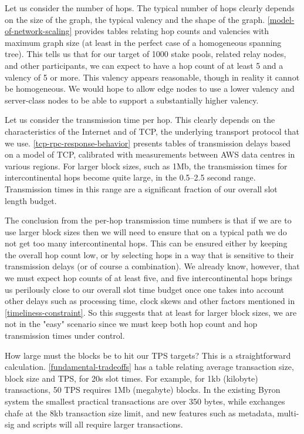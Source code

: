 \documentclass[11pt,a4paper]{article}
\begin{document}
Let us consider the number of hops. The typical number of hops clearly
depends on the size of the graph, the typical valency and the shape of
the graph. \cref{model-of-network-scaling}
provides tables relating hop counts and valencies with maximum graph
size (at least in the perfect case of a homogeneous spanning tree). This
tells us that for our target of 1000 stake pools, related relay nodes,
and other participants, we can expect to have a hop count of at least 5
and a valency of 5 or more. This valency appears reasonable, though in
reality it cannot be homogeneous. We would hope to allow edge nodes to
use a lower valency and server-class nodes to be able to support a
substantially higher valency.

Let us consider the transmission time per hop. This clearly depends on
the characteristics of the Internet and of TCP, the underlying transport
protocol that we use.
\cref{tcp-rpc-response-behavior} presents
tables of transmission delays based on a model of TCP, calibrated with
measurements between AWS data centres in various regions. For larger
block sizes, such as 1Mb, the transmission times for intercontinental
hops become quite large, in the 0.5--2.5 second range. Transmission
times in this range are a significant fraction of our overall slot
length budget.

The conclusion from the per-hop transmission time numbers is that if we
are to use larger block sizes then we will need to ensure that on a
typical path we do not get too many intercontinental hops. This can be
ensured either by keeping the overall hop count low, or by selecting
hops in a way that is sensitive to their transmission delays (or of
course a combination). We already know, however, that we must expect hop
counts of at least five, and five intercontinental hops brings us
perilously close to our overall slot time budget once one takes into
account other delays such as processing time, clock skews and other
factors mentioned in \cref{timeliness-constraint}. So this suggests that at least for larger block sizes, we are
not in the "easy" scenario since we must keep both hop count and hop
transmission times under control.

How large must the blocks be to hit our TPS targets? This is a
straightforward calculation.
\cref{fundamental-tradeoffs} has a table
relating average transaction size, block size and TPS, for 20s slot
times. For example, for 1kb (kilobyte) transactions, 50 TPS requires 1Mb
(megabyte) blocks. In the existing Byron system the smallest practical
transactions are over 350 bytes, while exchanges chafe at the 8kb
transaction size limit, and new features such as metadata, multi-sig and
scripts will all require larger transactions.
\end{document}
